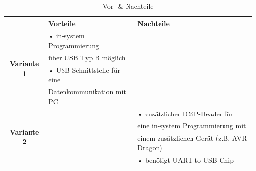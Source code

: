 \begin{table}[h]
  \centering
  \label{tab:mcu}
  \small
  \caption{Vor- \& Nachteile}
    \begin{tabular}{c|l|l}
          & \textbf{Vorteile} & \textbf{Nachteile} \\
    \toprule
    \multirow{4}[2]{*}{\textbf{Variante 1}} & • in-system Programmierung &  \\
          & \hspace{0.3cm} über USB Typ B möglich &  \\
          & • USB-Schnittstelle für eine &  \\
          &   \hspace{0.3cm} Datenkommunikation mit PC &  \\
    \hline
    \multirow{4}[1]{*}{\textbf{Variante 2}} &       & • zusätzlicher ICSP-Header für \\
          &       & \hspace{0.3cm} eine in-system Programmierung mit \\
          &       & \hspace{0.3cm} einem zusätzlichen Gerät (z.B. AVR Dragon) \\
          &       & • benötigt UART-to-USB Chip \\
    \end{tabular}%
  \label{tab:mcu}%
\end{table}%

\newpage
